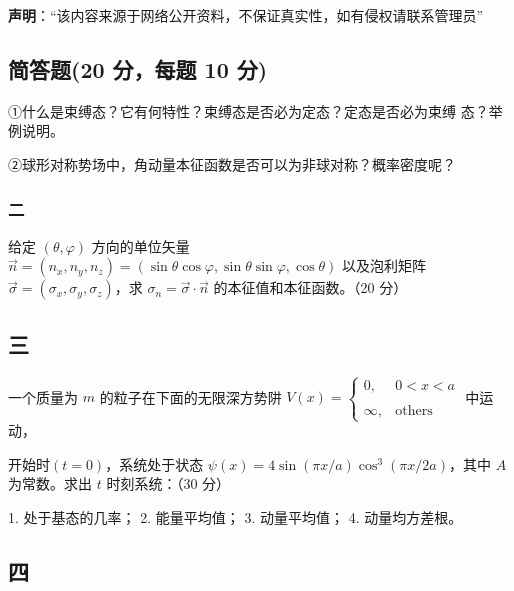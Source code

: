 
\textbf{声明}：“该内容来源于网络公开资料，不保证真实性，如有侵权请联系管理员”

\subsection{简答题(20 分，每题 10 分)}
①什么是束缚态？它有何特性？束缚态是否必为定态？定态是否必为束缚
态？举例说明。

②球形对称势场中，角动量本征函数是否可以为非球对称？概率密度呢？

\subsubsection{二}
 给定 $\left( \theta, \varphi \right)$ 方向的单位矢量 $\vec{n} = \left( n_x, n_y, n_z \right) = \left( \sin \theta \cos \varphi, \sin \theta \sin \varphi, \cos \theta \right)$ 以及泡利矩阵 $\vec{\sigma} = \left( \sigma_x, \sigma_y, \sigma_z \right)$，求 $\sigma_n = \vec{\sigma} \cdot \vec{n}$ 的本征值和本征函数。（20 分）

\subsection{三}
一个质量为 $m$ 的粒子在下面的无限深方势阱 $V(x) = 
\begin{cases} 
0, & 0 < x < a \\\\ 
\infty, & \text{others} 
\end{cases}$ 中运动，

开始时$(t=0)$，系统处于状态 $\psi(x) = 4\sin(\pi x/a)\cos^3(\pi x/2a)$，其中 $A$ 为常数。求出 $t$ 时刻系统：（30 分）

1. 处于基态的几率；
2. 能量平均值；
3. 动量平均值；
4. 动量均方差根。

\subsection{四}
